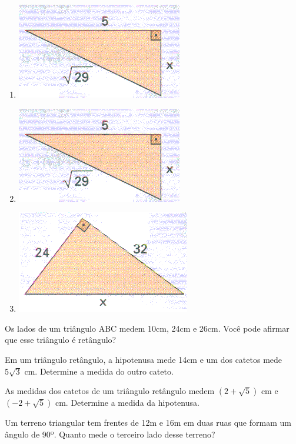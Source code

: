 \begin{multicols}{2}
\begin{enumerate}
		\item \includegraphics[scale=0.5]{figuras/fig72.png}
		\item \includegraphics[scale=0.5]{figuras/fig72.png}
		\item \includegraphics[scale=0.5]{figuras/fig73.png}		
	\end{enumerate}
	\end{multicols}
	
	\item Os lados de um triângulo ABC medem 10cm, 24cm e 26cm. Você pode afirmar que esse triângulo é retângulo?


	\item Em um triângulo retângulo, a hipotenusa mede 14cm e um dos catetos mede $5\sqrt{3}$ cm. Determine a medida do outro cateto.

	\item As medidas dos catetos de um triângulo retângulo medem $(2+\sqrt{5})$ cm e $(-2+\sqrt{5})$ cm. Determine a medida da hipotenusa.

	\item Um terreno triangular tem frentes de 12m e 16m em duas ruas que formam um ângulo de 90º. Quanto mede o terceiro lado desse terreno?


